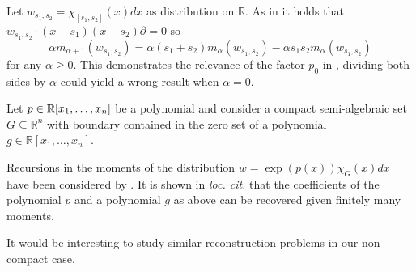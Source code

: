 \begin{example}
  Let $w_{s_1,s_2} = \chi_{[s_1,s_2]}(x)dx$ as distribution on $\mathbb{R}$.
  As in  it holds that $w_{s_1,s_2}\cdot (x-s_1)(x-s_2) \partial =0$ so
  $$\alpha m_{\alpha +1}(w_{s_1,s_2}) = \alpha (s_1 + s_2)m_{\alpha}(w_{s_1,s_2}) - \alpha s_1 s_2 m_{\alpha}(w_{s_1,s_2})$$
  for any $\alpha \geq 0$.
  This demonstrates the relevance of the factor $p_0$ in , dividing both sides by $\alpha$ could yield a wrong result when $\alpha = 0$.
\end{example}
\begin{remark}
  Let $p\in \mathbb{R}[x_1,\ldots,x_n]$ be a polynomial and consider a compact semi-algebraic set $G\subseteq \mathbb{R}^n$ with boundary contained in the zero set of a polynomial $g\in \mathbb{R}[x_1,\ldots,x_n]$.

  Recursions in the moments of the distribution $w = \exp(p(x)) \chi_G(x) dx$ have been considered by \cite{brehard2019moment}.
  It is shown in {\it loc. cit.} that the coefficients of the polynomial $p$ and a polynomial $g$ as above can be recovered given finitely many moments.

  It would be interesting to study similar reconstruction problems in our non-compact case.
\end{remark}
